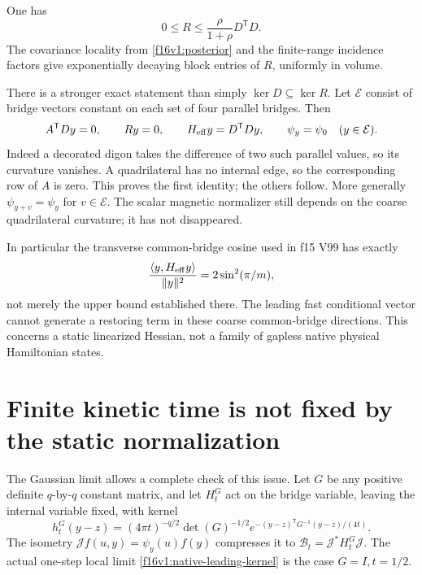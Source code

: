 \documentclass[11pt,oneside]{article}
\begin{document}
One has
\begin{equation}
 0\le R\le\frac{\rho}{1+\rho}D^{\mathsf T}D.
 \label{f16v1:Rbound}
\end{equation}
The covariance locality from \eqref{f16v1:posterior} and the
finite-range incidence factors give exponentially decaying
block entries of \(R\), uniformly in volume.

There is a stronger exact statement than simply
\(\ker D\subseteq\ker R\). Let \(\mathcal E\) consist of bridge
vectors constant on each set of four parallel bridges.
Then
\begin{equation}
 A^{\mathsf T}D y=0,\qquad R y=0,\qquad
 H_{\rm eff}y=D^{\mathsf T}Dy,\qquad \psi_y=\psi_0
                    \quad (y\in\mathcal E).
 \label{f16v1:common-bridge}
\end{equation}
Indeed a decorated digon takes the difference of two such
parallel values, so its curvature vanishes. A quadrilateral
has no internal edge, so the corresponding row of \(A\) is
zero. This proves the first identity; the others follow.
More generally \(\psi_{y+v}=\psi_y\) for \(v\in\mathcal E\).
The scalar magnetic normalizer still depends on the coarse
quadrilateral curvature; it has not disappeared.

In particular the transverse common-bridge cosine used in
f15 V99 has exactly
\[
       \frac{\langle y,H_{\rm eff}y\rangle}{\|y\|^2}
                           =2\sin^2(\pi/m),
\]
not merely the upper bound established there.
The leading fast conditional vector cannot generate a restoring
term in these coarse common-bridge directions.
This concerns a static linearized Hessian, not a family of
gapless native physical Hamiltonian states.

\section{Finite kinetic time is not fixed by the static normalization}
\label{f16v1:time}

The Gaussian limit allows a complete check of this issue.
Let \(G\) be any positive definite \(q\)-by-\(q\) constant matrix,
and let \(H_t^G\) act on the bridge variable, leaving the internal
variable fixed, with kernel
\[
 h_t^G(y-z)
 =(4\pi t)^{-q/2}\det(G)^{-1/2}
        e^{-(y-z)^{\mathsf T}G^{-1}(y-z)/(4t)}.
\]
The isometry \(\mathcal J f(u,y)=\psi_y(u)f(y)\) compresses it
to \(\mathcal B_t=\mathcal J^*H_t^G\mathcal J\).
The actual one-step local limit \eqref{f16v1:native-leading-kernel}
is the case \(G=I,t=1/2\).
\end{document}
